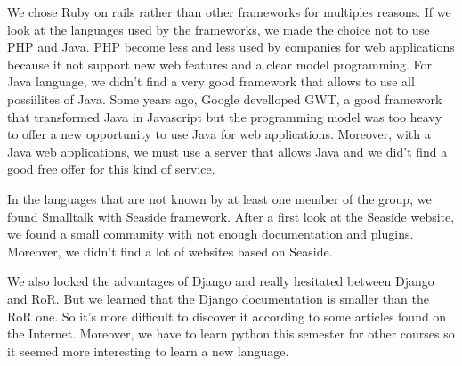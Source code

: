 We chose Ruby on rails rather than other frameworks for multiples reasons.  
If we look at the languages used by the frameworks, we made the choice not to use PHP 
and Java.  PHP become less and less used by companies for web applications because it not support new 
web features and a clear model programming.  For Java language, we didn't find a very good framework 
that allows to use all possiilites of Java.  Some years ago, Google develloped GWT, a good framework 
that transformed Java in Javascript but the programming model was too heavy to offer a new opportunity to 
use Java for web applications.  Moreover, with a Java web applications, we must use a server that allows 
Java and we did't find a good free offer for this kind of service.

In the languages that are not known by at least one member of the group, we found Smalltalk with 
Seaside framework.  After a first look at the Seaside website, we found a small community with not 
enough documentation and plugins.  Moreover, we didn't find a lot of websites based on Seaside.

We also looked the advantages of Django and really hesitated between Django and RoR. But we learned that
the Django documentation is smaller than the RoR one. So it's more difficult to discover it according to some articles found on the Internet. Moreover, we have to learn python this semester for other 
courses so it seemed more interesting to learn a new language.
